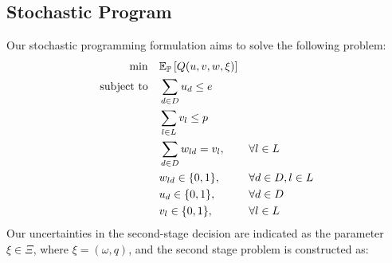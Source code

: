 \documentclass[preprint,review,11pt,authoryear]{elsarticle}
\begin{document}
\subsection{Stochastic Program}
\noindent
Our stochastic programming formulation aims to solve the following problem:
\begin{subequations}
    \begin{align}
        \min \quad & \mathbb{E}_{\mathbb{P}} \left[ Q(u,v,w,\xi) \right] && \label{objective:1stStageObj} \\
        \operatorname{subject~to} \quad & \sum_{d \in D} u_d \leq e     && \label{constraint:Num_Depot} \\
                         & \sum_{l \in L} v_l \leq p     && \label{constraint:Num_Launch} \\
                         & \sum_{d \in D} w_{ld} = v_l,  && \forall l \in L \label{constraint:LaunchPointtoOneDepot} \\
                         & w_{ld} \in \{0,1\}, && \forall d \in D, l \in L \label{constraint:wBinary} \\
                         & u_d \in \{0,1\}, && \forall d \in D \label{constraint:uBinary} \\
                         & v_l \in \{0,1\}, && \forall l \in L \label{constraint:vBinary}
    \end{align}
\end{subequations}
Our uncertainties in the second-stage decision are indicated as the parameter $\xi \in \Xi$, where $\xi = \left( \omega, q \right)$, and the second stage problem is constructed as:
\end{document}
